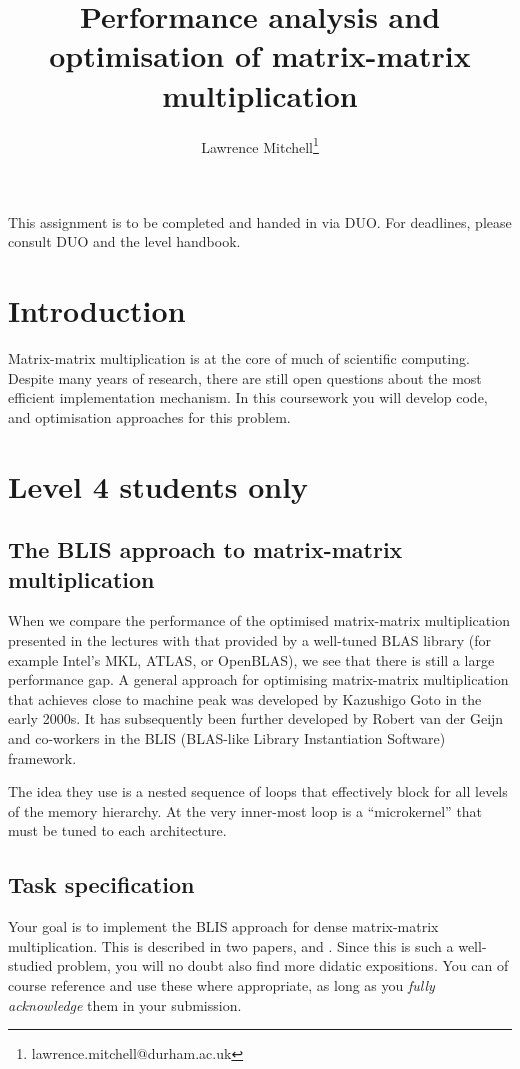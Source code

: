 \documentclass[a4paper]{article}
\title{Performance analysis and optimisation of matrix-matrix multiplication}
\author{Lawrence Mitchell\thanks{lawrence.mitchell@durham.ac.uk}}
\begin{document}
\maketitle

This assignment is to be completed and handed in via DUO. 
For deadlines, please consult DUO and the level handbook.

\section{Introduction}
\label{sec:introduction}
Matrix-matrix multiplication is at the core of much of scientific
computing.  Despite many years of research, there are still open
questions about the most efficient implementation mechanism.  In this
coursework you will develop code, and optimisation approaches for this
problem.

\section{Level 4 students only}
\label{sec:level-4-students}

\subsection{The BLIS approach to matrix-matrix multiplication}
\label{sec:blis}

When we compare the performance of the optimised matrix-matrix
multiplication presented in the lectures with that provided by a
well-tuned BLAS library (for example Intel's MKL, ATLAS, or OpenBLAS),
we see that there is still a large performance gap.  A general
approach for optimising matrix-matrix multiplication that achieves
close to machine peak was developed by Kazushigo Goto in the early
2000s.  It has subsequently been further developed by Robert van der
Geijn and co-workers in the BLIS (BLAS-like Library Instantiation
Software) framework.

The idea they use is a nested sequence of loops that effectively block
for all levels of the memory hierarchy.  At the very inner-most loop
is a ``microkernel'' that must be tuned to each architecture.

\subsection{Task specification}
\label{sec:task-l4}
Your goal is to implement the BLIS approach for dense matrix-matrix
multiplication.  This is described in two papers, \textcite{Goto:2008}
and \textcite{Zee:2015}.  Since this is such a well-studied problem,
you will no doubt also find more didatic expositions.  You can of
course reference and use these where appropriate, as long as you
\emph{fully acknowledge} them in your submission.
\end{document}

